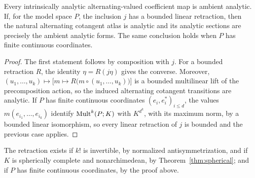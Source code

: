 \begin{proposition}\label{prop:ambient-agreement}
Every intrinsically analytic alternating-valued coefficient map is ambient analytic. If, for the model space $P$, the inclusion $j$ has a bounded linear retraction, then the natural alternating cotangent atlas is analytic and its analytic sections are precisely the ambient analytic forms. The same conclusion holds when $P$ has finite continuous coordinates.
\end{proposition}

\begin{proof}
The first statement follows by composition with $j$. For a bounded retraction $R$, the identity $\eta=R(j\eta)$ gives the converse. Moreover, $(u_1,\ldots,u_k)\mapsto\bigl[m\mapsto R\bigl(m\circ(u_1,\ldots,u_k)\bigr)\bigr]$ is a bounded multilinear lift of the precomposition action, so the induced alternating cotangent transitions are analytic. If $P$ has finite continuous coordinates $(e_i,e^*_i)_{i\le d}$, the values $m(e_{i_1},\ldots,e_{i_k})$ identify $\operatorname{Mult}^k(P;K)$ with $K^{d^k}$, with its maximum norm, by a bounded linear isomorphism, so every linear retraction of $j$ is bounded and the previous case applies.
\end{proof}

The retraction exists if $k!$ is invertible, by normalized antisymmetrization, and if $K$ is spherically complete and nonarchimedean, by Theorem~\ref{thm:spherical}; and if $P$ has finite continuous coordinates, by the proof above.

